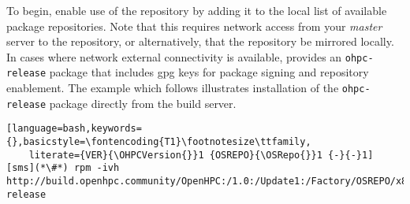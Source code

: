 To begin, enable use of the \OHPC{} repository by adding it to the local list
of available package repositories. Note that this requires network access from
your {\em master} server to the \OHPC{} repository, or alternatively, that
the \OHPC{} repository be mirrored locally.  In cases where network external
connectivity is available, \OHPC{} provides an \texttt{ohpc-release} package
that includes gpg keys for package signing and repository enablement.  The
example which follows illustrates installation of the \texttt{ohpc-release}
package directly from the \OHPC{} build server.


\begin{lstlisting}[language=bash,keywords={},basicstyle=\fontencoding{T1}\footnotesize\ttfamily,
	literate={VER}{\OHPCVersion{}}1 {OSREPO}{\OSRepo{}}1 {-}{-}1]
[sms](*\#*) rpm -ivh http://build.openhpc.community/OpenHPC:/1.0:/Update1:/Factory/OSREPO/x86_64/ohpc-release	
\end{lstlisting}







